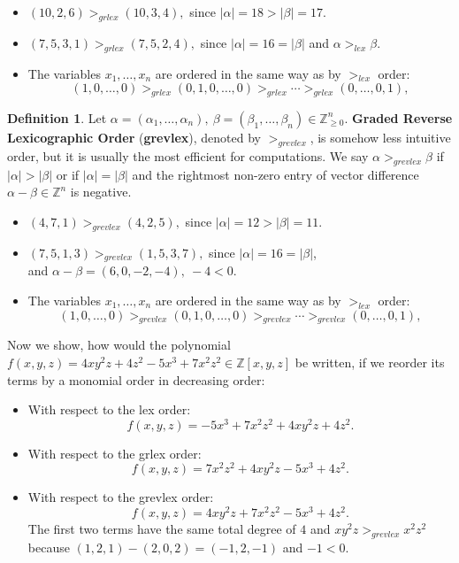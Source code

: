 \documentclass[thesis=M,english]{FITthesis}[2012/10/20]
\theoremstyle{remark}
\theoremstyle{definition}
\newtheorem{DF}{Definition}[section]
\begin{document}
\begin{itemize}
\item $(10,2,6) >_{grlex} (10, 3,4),$ since $|\alpha| = 18 > |\beta| = 17$.
\item $(7,5,3,1) >_{grlex} (7, 5, 2, 4),$ since $|\alpha| = 16 = |\beta|$ and $\alpha >_{lex} \beta$.
\item The variables $x_1,\ldots,x_n$ are ordered in the same way as by $>_{lex}$ order:
$$
(1,0,\ldots,0) >_{grlex} (0,1,0,\ldots, 0) >_{grlex} \cdots >_{grlex} (0, \ldots, 0, 1),
$$
\end{itemize} 
\begin{DF}
Let $\alpha = (\alpha_1, \ldots, \alpha_n),\ \beta = (\beta_1, \ldots, \beta_n)\in \mathbb{Z}_{\geq 0}^n.$ \textbf{Graded Reverse Lexicographic Order} (\textbf{grevlex}), denoted by $>_{grevlex}$, is somehow less intuitive order, but it is usually the most efficient for computations.  We say $\alpha >_{grevlex} \beta$ if $|\alpha| > |\beta|$ or if $|\alpha| = |\beta|$ and the rightmost non-zero entry of vector difference $\alpha - \beta \in \mathbb{Z}^n$ is negative.
\end{DF}
\begin{itemize}
\item $(4,7,1) >_{grevlex} (4, 2,5),$ since $|\alpha| = 12 > |\beta| = 11$.
\item $  (7, 5, 1, 3) >_{grevlex} (1,5,3,7),$ since $|\alpha| = 16 = |\beta|$, \\
and $\alpha - \beta = (6,0,-2, -4),\ -4 < 0$.
\item The variables $x_1,\ldots,x_n$ are ordered in the same way as by $>_{lex}$ order:
$$
(1,0,\ldots,0) >_{grevlex} (0,1,0,\ldots, 0) >_{grevlex} \cdots >_{grevlex} (0, \ldots, 0, 1),
$$
\end{itemize}
Now we show, how would the polynomial $f(x,y,z) = 4xy^2z + 4z^2 - 5x^3 + 7x^2z^2 \in \mathbb{Z}[x,y,z]$ be written, if we reorder its terms by a monomial order in decreasing order:
\begin{itemize}
\item With respect to the lex order:
$$
f(x,y,z) = -5x^3 + 7x^2z^2 + 4xy^2z + 4z^2.
$$
\item With respect to the grlex order:
$$
f(x,y,z) = 7x^2z^2  + 4xy^2z -5x^3 + 4z^2.
$$
\item With respect to the grevlex order:
$$
f(x,y,z) = 4xy^2z + 7x^2z^2  -5x^3 + 4z^2.
$$
The first two terms have the same total degree of $4$ and $xy^2z >_{grevlex} x^2z^2$ because $(1,2,1) - (2,0,2) = (-1,2,-1)$ and $-1 < 0$.
\end{itemize} 
\end{document}
